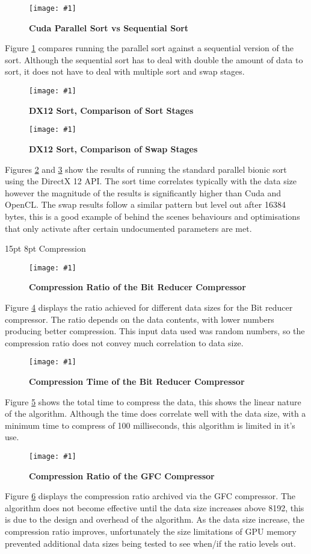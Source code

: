 \documentclass[12pt,a4paper]{article}
\makeatletter
\newcommand{\figuremacroWHHN}[3]{
	\begin{figure}[H] %
		\centering
		\texttt{[image: \#1]}
		\caption[#2]{\textbf{#2}}
		\label{fig:#1}
	\end{figure}
}
\newcommand{\figuremacroWHN}[3]{
	\begin{figure}[h!] %
		\centering
		\texttt{[image: \#1]}
		\caption[#2]{\textbf{#2}}
		\label{fig:#1}
	\end{figure}
}
\renewcommand\subsection{\@startsection {subsection}{1}{2mm} %
                               {15pt} %
                               {8pt} %
                               {\fontsize{13pt}{1em}\bfseries}}
\makeatother
\begin{document}
\figuremacroWHHN
{cudagpusort}
{Cuda Parallel Sort vs Sequential Sort}
{1.0}

Figure \ref{fig:cudagpusort} compares running the parallel sort against a sequential version of the sort. Although the sequential sort has to deal with double the amount of data to sort, 
it does not have to deal with multiple sort and swap stages.
\clearpage

\figuremacroWHHN
{dx12sortTime}
{DX12 Sort, Comparison of Sort Stages}
{1.0}
\figuremacroWHHN
{dx12swap}
{DX12 Sort, Comparison of Swap Stages}
{1.0}

Figures \ref{fig:dx12sortTime} and \ref{fig:dx12swap} show the results of running the standard parallel bionic sort using the DirectX 12 API. The sort time correlates typically with the data size however the magnitude of the results is significantly higher than Cuda and OpenCL.
The swap results follow a similar pattern but level out after 16384 bytes, this is a good example of behind the scenes behaviours and optimisations that only activate after certain undocumented parameters are met.

\clearpage
\subsection{Compression}
\figuremacroWHN
{BitCompressRatio}
{Compression Ratio of the Bit Reducer Compressor}
{1.0}

Figure \ref{fig:BitCompressRatio} displays the ratio achieved for different data sizes for the Bit reducer compressor. The ratio depends on the data contents, with lower numbers producing better compression. This input data used was random numbers, so the compression ratio does not convey much correlation to data size.

\figuremacroWHHN
{BitCompressTime}
{Compression Time of the Bit Reducer Compressor}
{1.0}

Figure \ref{fig:BitCompressTime} shows the total time to compress the data, this shows the linear nature of the algorithm. Although the time does correlate well with the data size, with a minimum time to compress of 100 milliseconds, this algorithm is limited in it's use.

\figuremacroWHN
{GFCcompressionRatio}
{Compression Ratio of the GFC Compressor}
{1.0}

Figure \ref{fig:GFCcompressionRatio} displays the compression ratio archived via the GFC compressor. The algorithm does not become effective until the data size increases above 8192, this is due to the design and overhead of the algorithm. As the data size increase, the compression ratio improves, unfortunately the size limitations of GPU memory prevented additional data sizes being tested to see when/if the ratio levels out.
\end{document}
